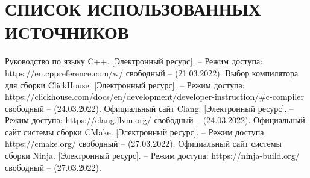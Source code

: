 \section*{СПИСОК ИСПОЛЬЗОВАННЫХ ИСТОЧНИКОВ}

\begingroup
\renewcommand{\section}[2]{}
\begin{thebibliography}{}
    Руководство по языку C++. [Электронный ресурс]. – Режим доступа: https://en.cppreference.com/w/ свободный – (21.03.2022).
    Выбор компилятора для сборки ClickHouse. [Электронный ресурс]. – Режим доступа: https://clickhouse.com/docs/en/development/developer-instruction/#c-compiler свободный – (24.03.2022).
    Официальный сайт Clang. [Электронный ресурс]. – Режим доступа: https://clang.llvm.org/ свободный – (24.03.2022).
    Официальный сайт системы сборки CMake. [Электронный ресурс]. – Режим доступа: https://cmake.org/ свободный – (27.03.2022).
    Официальный сайт системы сборки Ninja. [Электронный ресурс]. – Режим доступа: https://ninja-build.org/ свободный – (27.03.2022).
\end{thebibliography}
\endgroup

\pagebreak
